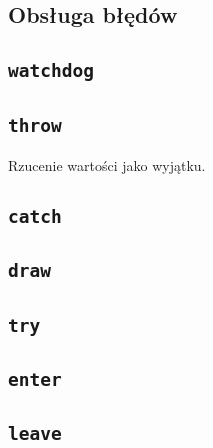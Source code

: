 \subsection{Obsługa błędów}
\label{viua_vm_ops_error_handling}

\subsection{\texttt{watchdog}}

\subsection{\texttt{throw}}

Rzucenie wartości jako wyjątku.

\subsection{\texttt{catch}}
\subsection{\texttt{draw}}
\subsection{\texttt{try}}
\subsection{\texttt{enter}}
\subsection{\texttt{leave}}
